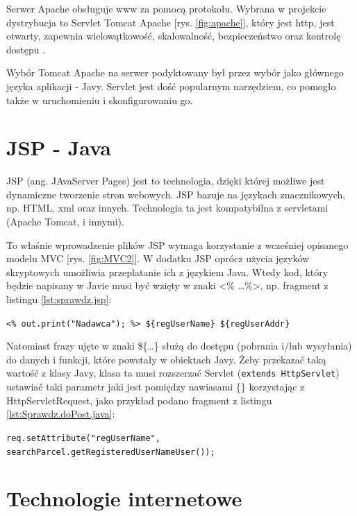 \documentclass[eng,printmode,oneside]{mgr}
\begin{document}
Serwer Apache obsługuje www za pomocą protokołu. Wybrana w projekcie dystrybucja
to Servlet Tomcat Apache [rys. \ref{fig:apache}], który jest http, jest otwarty,
zapewnia wielowątkowość, skalowalność, bezpieczeństwo oraz kontrolę dostępu
\cite{apache.wiki}.

Wybór Tomcat Apache na serwer podyktowany był przez wybór jako głównego języka
aplikacji - Javy. Servlet jest dość popularnym narzędziem, co pomogło także w
uruchomieniu i skonfigurowaniu go.

\section{JSP - Java}

JSP (ang. JAvaServer Pages) jest to technologia, dzięki której możliwe jest
dynamiczne tworzenie stron webowych. JSP bazuje na językach znacznikowych, np.
HTML, xml oraz innych. Technologia ta jest kompatybilna z servletami (Apache
Tomcat, i innymi).

To właśnie wprowadzenie plików JSP wymaga korzystanie z wcześniej
opisanego modelu MVC [rys. \ref{fig:MVC2}]. W dodatku JSP oprócz użycia języków
skryptowych umożliwia przeplatanie ich z językiem Java. Wtedy kod, który będzie
napisany w Javie musi być wzięty w znaki <\% \ldots \%>, np. fragment z listingu
\ref{lst:sprawdz.jsp}:

\texttt{<\% out.print("Nadawca"); \%> \$\{regUserName\}
\$\{regUserAddr\}}

Natomiast frazy ujęte w znaki \$\{\ldots\} służą do dostępu (pobrania
i/lub wysyłania) do danych i funkcji, które powstały w obiektach Javy. Żeby
przekazać taką wartość z klasy Javy, klasa ta musi rozszerzać Servlet
(\texttt{extends HttpServlet}) ustawiać taki parametr jaki jest pomiędzy
nawiasami \{\} korzystając z HttpServletRequest, jako przykład podano fragment z
listingu \ref{lst:Sprawdz.doPost.java}:

\texttt{req.setAttribute("regUserName",
						searchParcel.getRegisteredUserNameUser());}

\section{Technologie internetowe}
\end{document}
